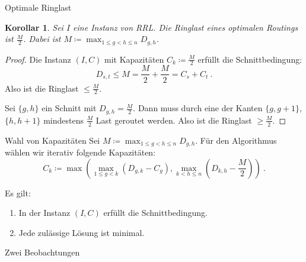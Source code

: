 \documentclass[8pt]{beamer}
\newcommand{\RRL}{\textsc{RRL}\xspace}
\theoremstyle{claim}
\newtheorem{mylemma}[theorem]{Lemma}
\newtheorem{mycorollary}[theorem]{Korollar}
\begin{document}
	\begin{frame}{Optimale Ringlast}
		\begin{mycorollary}
			Sei $I$ eine Instanz von \RRL.
			Die Ringlast eines optimalen Routings ist $\frac{M}{2}$.
			Dabei ist $M \coloneqq \max_{1 \leq g < h \leq n} D_{g, h}$.
		\end{mycorollary}\pause
		\begin{proof}
			Die Instanz $(I, C)$ mit Kapazitäten $C_k \coloneqq \frac{M}{2}$ erfüllt die Schnittbedingung:
			\begin{equation}
				D_{s, t} \leq M = \frac{M}{2} + \frac{M}{2} = C_s + C_t \ .
			\end{equation}
			Also ist die Ringlast $\leq \frac{M}{2}$.\pause
			
			Sei $\{g, h\}$ ein Schnitt mit $D_{g, h} = \frac{M}{2}$.
			Dann muss durch eine der Kanten $\{g, g+1\}$, $\{h, h+1\}$ mindestens $\frac{M}{2}$ Last geroutet werden.
			Also ist die Ringlast $\geq \frac{M}{2}$.
		\end{proof}
	\end{frame}

	\begin{frame}{Wahl von Kapazitäten}
		Sei $M \coloneqq \max_{1 \leq g < h \leq n} D_{g, h}$.
		Für den Algorithmus wählen wir iterativ folgende Kapazitäten:
		\begin{equation}
			C_k \coloneqq \max \left(\max_{1 \leq g < k}(D_{g, k} - C_g), \max_{k < h \leq n}(D_{k, h} - \frac{M}{2})\right) \ .
		\end{equation}

		Es gilt:
		\begin{enumerate}
			\item In der Instanz $(I, C)$ erfüllt die Schnittbedingung.
			\item Jede zulässige Lösung ist minimal.
		\end{enumerate}
	\end{frame}

	\begin{frame}{Zwei Beobachtungen}
		\begin{columns}
			
		\end{columns}

	\end{frame}
\end{document}
